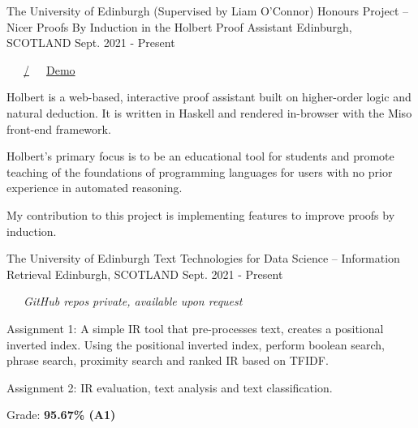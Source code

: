 \begin{cventries}
  \cventry
    {The University of Edinburgh (Supervised by Liam O'Connor)} %
    {Honours Project -- Nicer Proofs By Induction in the Holbert Proof Assistant} %
    {Edinburgh, SCOTLAND} %
    {Sept. 2021 - Present} %
    {
      \color{awesome} \color{graytext}\ \ \ \href{https://github.com/chrisjpm/holbert}{\faGithub\acvHeaderIconSep\@chrisjpm/\@holbert}\ \ \ \href{http://liamoc.net/holbert}{\faGlobe\acvHeaderIconSep\@Holbert Demo}%
      \vspace{1.6em}
      \begin{cvitems} %
        \item Holbert is a web-based, interactive proof assistant built on higher-order logic and natural deduction. It is written in Haskell and rendered in-browser with the Miso front-end framework.
        \item Holbert’s primary focus is to be an educational tool for students and promote teaching of the foundations of programming languages for users with no prior experience in automated reasoning.
        \item My contribution to this project is implementing features to improve proofs by induction.
      \end{cvitems}
    }
    
  \cventry
    {The University of Edinburgh} %
    {Text Technologies for Data Science -- Information Retrieval} %
    {Edinburgh, SCOTLAND} %
    {Sept. 2021 - Present} %
    {
      \color{awesome}\color{graytext}\ \ \ \textit{GitHub repos private, available upon request}
      \vspace{1.6em}
      \begin{cvitems} %
        \item Assignment 1: A simple IR tool that pre-processes text, creates a positional inverted index. Using the positional inverted index, perform boolean search, phrase search, proximity search and ranked IR based on TFIDF.
        \item Assignment 2: IR evaluation, text analysis and text classification.
        \item Grade: \textbf{95.67\% (A1)}
      \end{cvitems}
    }
    

\end{cventries}
